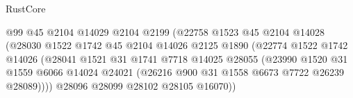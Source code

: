 \begin{lexlean}{RustCore}
\begin{coremodule}
                                        @99
                                        @45
                                        @2104
                                        @14029
                                        @2104
                                        @2199
                                        (@22758
                                          @1523
                                          @45
                                          @2104
                                          @14028
                                          (@28030
                                            @1522
                                            @1742
                                            @45
                                            @2104
                                            @14026
                                            @2125
                                            @1890
                                            (@22774
                                              @1522
                                              @1742
                                              @14026
                                              (@28041
                                                @1521
                                                @31
                                                @1741
                                                @7718
                                                @14025
                                                @28055
                                                (@23990
                                                  @1520
                                                  @31
                                                  @1559
                                                  @6066
                                                  @14024
                                                  @24021
                                                  (@26216
                                                    @900
                                                    @31
                                                    @1558
                                                    @6673
                                                    @7722
                                                    @26239
                                                    @28089))))
                                            @28096
                                            @28099
                                            @28102
                                            @28105
                                            @16070))

\end{coremodule}
\end{lexlean}

